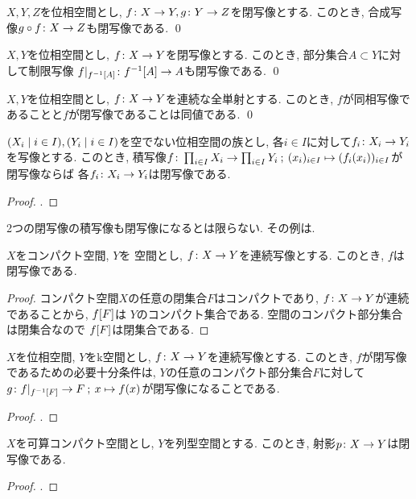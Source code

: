 \documentclass[uplatex, dvipdfmx, a4paper, 12pt, class=jsbook, crop=false]{standalone}
\begin{document}
\begin{proposition}
    $ X, Y, Z $を位相空間とし, $ f\colon X\to Y, g\colon Y\to Z $を閉写像とする.
    このとき, 合成写像$ g \circ f\colon X\to Z $も閉写像である.
    \qed
\end{proposition}

\begin{proposition}
    $ X, Y $を位相空間とし, $ f\colon X\to Y $を閉写像とする.
    このとき, 部分集合$ A \subset Y $に対して制限写像
    $ \morph{f|_{\mapinvset{f}{A}}}{\mapinvset{f}{A}}{A} $も閉写像である.
    \qed
\end{proposition}

\begin{proposition}
    $ X, Y $を位相空間とし, $ f\colon X\to Y $を連続な全単射とする.
    このとき, $ f $が同相写像であることと$ f $が閉写像であることは同値である.
    \qed
\end{proposition}

\begin{proposition}
    $ \setfamily{X_i}{i \in I}, \setfamily{Y_i}{i \in I} $を空でない位相空間の族とし,
    各$ i \in I $に対して$ f_i\colon X_i\to Y_i $を写像とする.
    このとき, 積写像$ \morph{f}{\prod_{i \in I} X_i}{\prod_{i \in I} Y_i}
    \semicolon (x_i)_{i \in I} \mapsto (\mappt{f_i}{x_i})_{i \in I} $が閉写像ならば
    各$ f_i\colon X_i\to Y_i $は閉写像である.
\end{proposition}

\begin{proof}
    \WIP.
\end{proof}

\begin{example}
    2つの閉写像の積写像も閉写像になるとは限らない. その例は\WIP.
\end{example}

\begin{proposition}
    $ X $をコンパクト空間, $ Y $を \Hausdorff 空間とし, $ f\colon X\to Y $を連続写像とする.
    このとき, $ f $は閉写像である.
\end{proposition}

\begin{proof}
    コンパクト空間$ X $の任意の閉集合$ F $はコンパクトであり,
    $ f\colon X\to Y $が連続であることから, $ \mapset{f}{F} $は
    $ Y $のコンパクト集合である. \Hausdorff 空間のコンパクト部分集合は閉集合なので
    $ \mapset{f}{F} $は閉集合である.
\end{proof}

\begin{proposition}
    $ X $を位相空間, $ Y $をk空間とし, $ f\colon X\to Y $を連続写像とする.
    このとき, $ f $が閉写像であるための必要十分条件は, $ Y $の任意のコンパクト部分集合$ F $に対して
    $ \morph{g}{f|_{\mapinvset{f}{F}}}{F} \semicolon x \mapsto \mappt{f}{x} $が閉写像になることである.
\end{proposition}

\begin{proof}
    \WIP.
\end{proof}

\begin{proposition}
    $ X $を可算コンパクト空間とし, $ Y $を列型空間とする. このとき, 射影$ p\colon X\to Y $は閉写像である.
\end{proposition}

\begin{proof}
    \WIP.
\end{proof}
\end{document}
